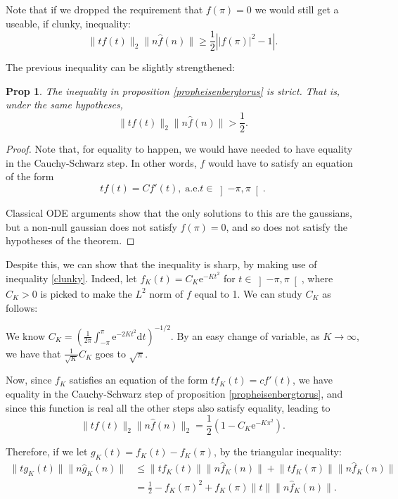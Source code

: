 \documentclass{amsart}
\newcommand{\dd}{\mathrm{d}}
\newcommand{\e}{\mathrm{e}}
\newtheorem{prop}{Prop}
\begin{document}
Note that if we dropped the requirement that $f(\pi) = 0$ we would still get a useable, if clunky, inequality:
\begin{equation}\label{clunky}
\lVert t f(t) \rVert_2 \lVert n \hat f(n) \rVert \geq \frac12\left\lvert \lvert f(\pi) \rvert^2 - 1\right\rvert.
\end{equation}

The previous inequality can be slightly strengthened:

\begin{prop}
The inequality in proposition \ref{propheisenbergtorus} is strict. That is, under the same hypotheses,
\[
\lVert t f(t) \rVert_2 \lVert n \hat f(n) \rVert > \frac12.
\]
\end{prop}

\begin{proof}
Note that, for equality to happen, we would have needed to have equality in the Cauchy-Schwarz step. In other words, $f$ would have to satisfy an equation of the form
\[t f(t) = C f'(t), \; \text{a.e.} t \in \left]-\pi, \pi\right[.\]

Classical ODE arguments show that the only solutions to this are the gaussians, but a non-null gaussian does not satisfy $f(\pi) = 0$, and so does not satisfy the hypotheses of the theorem.
\end{proof}

Despite this, we can show that the inequality is sharp, by making use of inequality \eqref{clunky}. Indeed, let $f_K(t) = C_K \e^{- K t^2}$ for $t \in \left]-\pi, \pi\right[$, where $C_K > 0$ is picked to make the $L^2$ norm of $f$ equal to 1. We can study $C_K$ as follows:

We know $C_K = \left( \frac1{2 \pi} \int_{-\pi}^\pi \e^{-2 K t^2} \dd t \right)^{-1/2}$. By an easy change of variable, as $K \to \infty$, we have that $\frac1{\sqrt{K}} C_K$ goes to $\sqrt \pi$.

Now, since $f_K$ satisfies an equation of the form $t f_K(t) = c f'(t)$, we have equality in the Cauchy-Schwarz step of proposition \ref{propheisenbergtorus}, and since this function is real all the other steps also satisfy equality, leading to
\[\lVert t f(t) \rVert_2 \lVert n \hat f(n) \rVert_2 = \frac12(1 - C_K \e^{- K \pi^2}).\]

Therefore, if we let $g_K(t) = f_K(t) - f_K(\pi)$, by the triangular inequality:
\begin{align*}
\lVert t g_K(t) \rVert \lVert n \hat g_K(n) \rVert &\leq \lVert t f_K(t) \rVert \lVert n \hat f_K(n) \rVert + \lVert t f_K(\pi) \rVert \lVert n \hat f_K(n) \rVert\\
&= \frac12 - f_K(\pi)^2 + f_K(\pi) \lVert t \rVert \lVert n \hat f_K(n) \rVert.
\end{align*}
\end{document}
